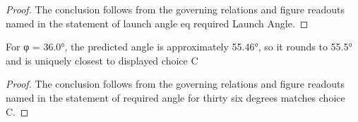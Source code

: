 \begin{proof}
  The conclusion follows from the governing relations and figure readouts named in the statement of launch angle eq required Launch Angle.
\end{proof}
\begin{lemma}
  \label{lem:physics:phyx-mini-0742:phyxminiproblems-problemphyxmini0742-required-angle-for-thirty-six-degrees-matches-choice-c}
  For φ = 36.0°, the predicted angle is approximately 55.46°, so it rounds to 55.5° and is uniquely closest to displayed choice C
\end{lemma}
\begin{proof}
  The conclusion follows from the governing relations and figure readouts named in the statement of required angle for thirty six degrees matches choice C.
\end{proof}
